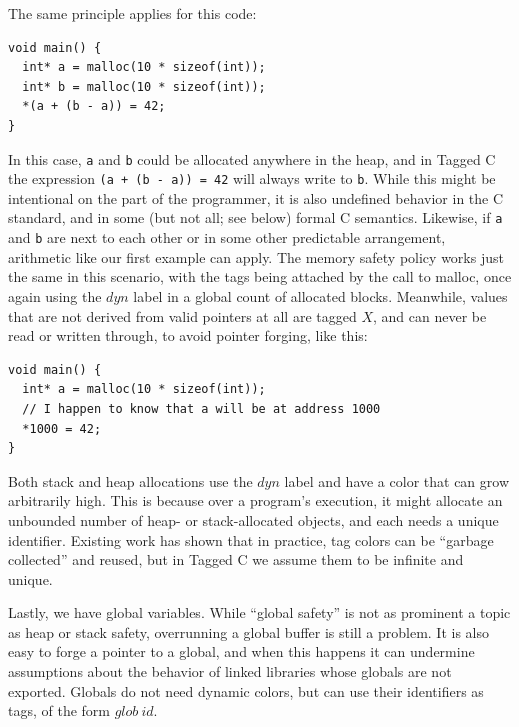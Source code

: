 \documentclass{article}
\begin{document}
The same principle applies for this code:

\vspace{\abovedisplayskip}
\begin{verbatim}
void main() {
  int* a = malloc(10 * sizeof(int));
  int* b = malloc(10 * sizeof(int));
  *(a + (b - a)) = 42;
}
\end{verbatim}
\vspace{\belowdisplayskip}

In this case, {\tt a} and {\tt b} could be allocated anywhere in the heap, and in Tagged C
the expression {\tt *(a + (b - a)) = 42} will always write to {\tt *b}. While this might be intentional
on the part of the programmer, it is also undefined behavior in the C standard, and in some
(but not all; see below) formal C semantics. Likewise, if {\tt a} and {\tt b} are next to each other
or in some other predictable arrangement, arithmetic like our first example can apply.
The memory safety policy works just the same in this scenario, with the tags being attached
by the call to malloc, once again using the \(\mathit{dyn}\) label in a global count of allocated blocks.
Meanwhile, values that are not derived from valid pointers at all are tagged \(X\), and can never
be read or written through, to avoid pointer forging, like this:

\vspace{\abovedisplayskip}
\begin{verbatim}
void main() {
  int* a = malloc(10 * sizeof(int));
  // I happen to know that a will be at address 1000
  *1000 = 42;
}
\end{verbatim}
\vspace{\belowdisplayskip}

Both stack and heap allocations use the \(\mathit{dyn}\) label and have a color that can grow arbitrarily
high. This is because over a program's execution, it might allocate an unbounded number of heap- or
stack-allocated objects, and each needs a unique identifier. Existing work has shown that in practice,
tag colors can be ``garbage collected'' and reused, but in Tagged C we assume them to be infinite and unique.

Lastly, we have global variables. While ``global safety'' is not as prominent a topic as heap or
stack safety, overrunning a global buffer is still a problem. It is also easy to forge a pointer to a global,
and when this happens it can undermine assumptions about the behavior of linked libraries whose globals
are not exported. Globals do not need dynamic colors, but can use their identifiers as tags, of the form
\(\mathit{glob} ~ id\).
\end{document}
